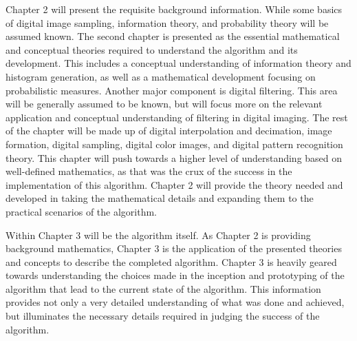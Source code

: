 %
%
%
%
%
%

%
%
%



Chapter 2 will present the requisite background information. While some basics of digital image sampling, information theory, and probability theory will be assumed known. The second chapter is presented as the essential mathematical and conceptual theories required to understand the algorithm and its development. This includes a conceptual understanding of information theory and histogram generation, as well as a mathematical development focusing on probabilistic measures. Another major component is digital filtering. This area will be generally assumed to be known, but will focus more on the relevant application and conceptual understanding of filtering in digital imaging. The rest of the chapter will be made up of digital interpolation and decimation, image formation, digital sampling, digital color images, and digital pattern recognition theory. This chapter will push towards a higher level of understanding based on well-defined mathematics, as that was the crux of the success in the implementation of this algorithm. Chapter 2 will provide the theory needed and developed in taking the mathematical details and expanding them to the practical scenarios of the algorithm.

Within Chapter 3 will be the algorithm itself. As Chapter 2 is providing background mathematics, Chapter 3 is the application of the presented theories and concepts to describe the completed algorithm. Chapter 3 is heavily geared towards understanding the choices made in the inception and prototyping of the algorithm that lead to the current state of the algorithm. This information provides not only a very detailed understanding of what was done and achieved, but illuminates the necessary details required in judging the success of the algorithm.

